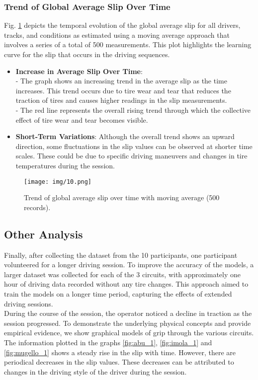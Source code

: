 \documentclass[a4paper,final,12pt]{report}
\begin{document}
\subsubsection{Trend of Global Average Slip Over Time}
Fig. \ref{fig:global_average_slip} depicts the temporal evolution of the global average slip for all drivers, tracks, and conditions as estimated using a moving average approach that involves a series of a total of 500 measurements. This plot highlights the learning curve for the slip that occurs in the driving sequences.

\begin{itemize}
    \item \textbf{Increase in Average Slip Over Time}:\\
    - The graph shows an increasing trend in the average slip as the time increases. This trend occurs due to tire wear and tear that reduces the traction of tires and causes higher readings in the slip measurements.\\
    -  The red line represents the overall rising trend through which the collective effect of tire wear and tear becomes visible.

    \item \textbf{Short-Term Variations}: Although the overall trend shows an upward direction, some fluctuations in the slip values can be observed at shorter time scales. These could be due to specific driving maneuvers and changes in tire temperatures during the session.

\end{itemize}

\begin{figure}[H]
    \centering
    \texttt{[image: img/10.png]}
    \caption{Trend of global average slip over time with moving average (500 records).}
    \label{fig:global_average_slip}
\end{figure}

\subsection{Other Analysis}
Finally, after collecting the dataset from the 10 participants, one participant volunteered for a longer driving session. To improve the accuracy of the models, a larger dataset was collected for each of the 3 circuits, with approximately one hour of driving data recorded without any tire changes. This approach aimed to train the models on a longer time period, capturing the effects of extended driving sessions.\\
During the course of the session, the operator noticed a decline in traction as the session progressed. To demonstrate the underlying physical concepts and provide empirical evidence, we show graphical models of grip through the various circuits.\\
The information plotted in the graphs \ref{fig:abu_1}, \ref{fig:imola_1} and \ref{fig:mugello_1} shows a steady rise in the slip with time. However, there are periodical decreases in the slip values. These decreases can be attributed to changes in the driving style of the driver during the session.
\end{document}
